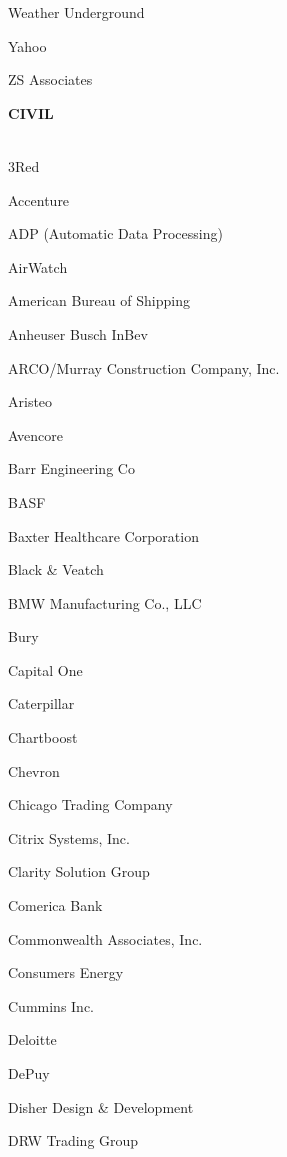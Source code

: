 \documentclass[twoside]{article}
\begin{document}
\begin{center}
\begin{multicols}{5}
\begin{FlushLeft}
\begin{compactitem}
\item Weather Underground
\item Yahoo
\item ZS Associates
\end{compactitem}
        \end{FlushLeft}
        \vspace{1em}
        {\fontsize{14}{16}\selectfont \bf CIVIL}\\
        \vspace{-1em}
        ~\hrulefill~
        \vspace{-.9em}
        \begin{FlushLeft}
        \begin{compactitem}
        \item 3Red
\item Accenture
\item ADP (Automatic Data Processing)
\item AirWatch
\item American Bureau of Shipping
\item Anheuser Busch InBev
\item ARCO/Murray Construction Company, Inc.
\item Aristeo
\item Avencore
\item Barr Engineering Co
\item BASF
\item Baxter Healthcare Corporation
\item Black \& Veatch
\item BMW Manufacturing Co., LLC
\item Bury
\item Capital One
\item Caterpillar
\item Chartboost
\item Chevron
\item Chicago Trading Company
\item Citrix Systems, Inc.
\item Clarity Solution Group
\item Comerica Bank
\item Commonwealth Associates, Inc.
\item Consumers Energy
\item Cummins Inc.
\item Deloitte
\item DePuy
\item Disher Design \& Development
\item DRW Trading Group

\end{compactitem}
\end{FlushLeft}
\end{multicols}
\end{center}
\end{document}
